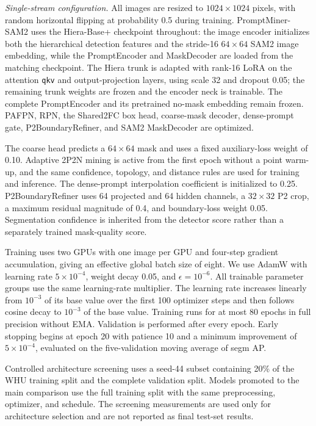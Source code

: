 \documentclass[letterpaper,journal]{IEEEtran}
\begin{document}
\noindent\textit{Single-stream configuration.}
All images are resized to $1024\times1024$ pixels, with random horizontal flipping at probability 0.5 during training. PromptMiner-SAM2 uses the Hiera-Base+ checkpoint throughout: the image encoder initializes both the hierarchical detection features and the stride-16 $64\times64$ SAM2 image embedding, while the PromptEncoder and MaskDecoder are loaded from the matching checkpoint. The Hiera trunk is adapted with rank-16 LoRA on the attention \texttt{qkv} and output-projection layers, using scale 32 and dropout 0.05; the remaining trunk weights are frozen and the encoder neck is trainable. The complete PromptEncoder and its pretrained no-mask embedding remain frozen. PAFPN, RPN, the Shared2FC box head, coarse-mask decoder, dense-prompt gate, P2BoundaryRefiner, and SAM2 MaskDecoder are optimized.

The coarse head predicts a $64\times64$ mask and uses a fixed auxiliary-loss weight of 0.10. Adaptive 2P2N mining is active from the first epoch without a point warm-up, and the same confidence, topology, and distance rules are used for training and inference. The dense-prompt interpolation coefficient is initialized to 0.25. P2BoundaryRefiner uses 64 projected and 64 hidden channels, a $32\times32$ P2 crop, a maximum residual magnitude of 0.4, and boundary-loss weight 0.05. Segmentation confidence is inherited from the detector score rather than a separately trained mask-quality score.

Training uses two GPUs with one image per GPU and four-step gradient accumulation, giving an effective global batch size of eight. We use AdamW with learning rate $5\times10^{-4}$, weight decay 0.05, and $\epsilon=10^{-6}$. All trainable parameter groups use the same learning-rate multiplier. The learning rate increases linearly from $10^{-3}$ of its base value over the first 100 optimizer steps and then follows cosine decay to $10^{-3}$ of the base value. Training runs for at most 80 epochs in full precision without EMA. Validation is performed after every epoch. Early stopping begins at epoch 20 with patience 10 and a minimum improvement of $5\times10^{-4}$, evaluated on the five-validation moving average of segm AP.

Controlled architecture screening uses a seed-44 subset containing 20\% of the WHU training split and the complete validation split. Models promoted to the main comparison use the full training split with the same preprocessing, optimizer, and schedule. The screening measurements are used only for architecture selection and are not reported as final test-set results.
\end{document}
